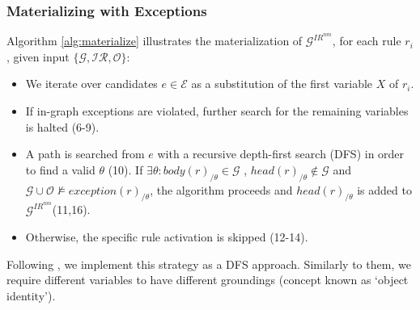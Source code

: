 \documentclass[a4paper,UKenglish,cleveref, autoref, thm-restate]{tgdk-v2021}
\begin{document}
\subsubsection{Materializing with Exceptions} Algorithm \ref{alg:materialize} illustrates the materialization of $\mathcal{G}^{IR^{nm}}$, for each rule \textit{$r_i$}, given input $\{\mathcal{G,IR,O}\}$:
\begin{itemize}
    \item We iterate over candidates $e \in \mathcal{E}$ as a substitution of the first variable $X$ of \textit{$r_i$}.
    \item If in-graph exceptions are violated, further search for the remaining variables is halted (6-9).
    \item A path is searched from $e$ with a recursive depth-first search (DFS) in order to find a valid $\theta$ (10). If $\exists \theta: body(r)_{/\theta} \in \mathcal{G}$ ,  $head(r)_{/\theta} \not\in \mathcal{G}$ and $\mathcal{G} \cup \mathcal{O} \not\models exception(r)_{/\theta}$, the algorithm proceeds and $head(r)_{/\theta}$ is added to $\mathcal{G}^{IR^{nm}}$(11,16).
    \item Otherwise, the specific rule activation is skipped (12-14).  
\end{itemize}

Following \cite{meilicke_anytime_2024}, we implement this strategy as a DFS approach. Similarly to them, we require different variables to have different groundings (concept known as `object identity'). 

\newcommand{\GIRnm}{\mathcal{G}^{IR^{nm}}}
\newcommand{\G}{\mathcal{G}}
\newcommand{\E}{\mathcal{E}}
\newcommand{\Oset}{\mathcal{O}}
\end{document}
